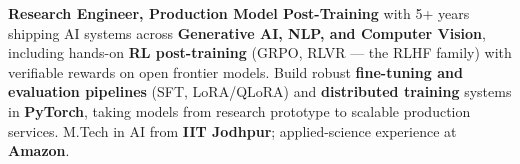 \documentclass[letter,10pt]{article}
\begin{document}

\textbf{Research Engineer, Production Model Post-Training} with 5+ years shipping AI systems across \textbf{Generative AI, NLP, and Computer Vision}, including hands-on \textbf{RL post-training} (GRPO, RLVR --- the RLHF family) with verifiable rewards on open frontier models.
Build robust \textbf{fine-tuning and evaluation pipelines} (SFT, LoRA/QLoRA) and \textbf{distributed training} systems in \textbf{PyTorch}, taking models from research prototype to scalable production services.
M.Tech in AI from \textbf{IIT Jodhpur}; applied-science experience at \textbf{Amazon}.
\end{document}
